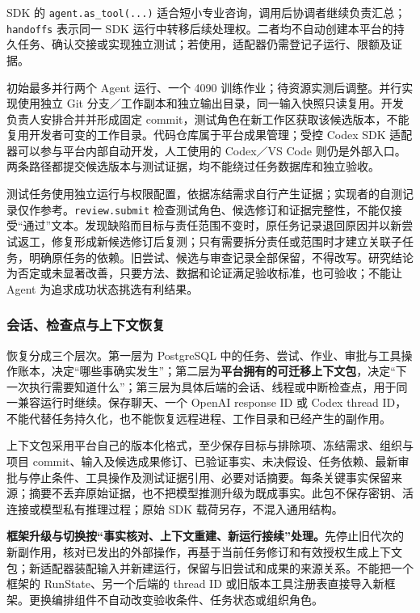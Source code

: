 \documentclass[11pt,a4paper]{article}
\begin{document}
SDK 的 \texttt{agent.as\_tool(...)} 适合短小专业咨询，调用后协调者继续负责汇总；\texttt{handoffs} 表示同一 SDK 运行中转移后续处理权。二者均不自动创建本平台的持久任务、确认交接或实现独立测试；若使用，适配器仍需登记子运行、限额及证据。\cite{rdRuntimeOrchestration}

初始最多并行两个 Agent 运行、一个 4090 训练作业；待资源实测后调整。并行实现使用独立 Git 分支／工作副本和独立输出目录，同一输入快照只读复用。开发负责人安排合并并形成固定 commit，测试角色在新工作区获取该候选版本，不能复用开发者可变的工作目录。代码仓库属于平台成果管理；受控 Codex SDK 适配器可以参与平台内部自动开发，人工使用的 Codex／VS Code 则仍是外部入口。两条路径都提交候选版本与测试证据，均不能绕过任务数据库和独立验收。

测试任务使用独立运行与权限配置，依据冻结需求自行产生证据；实现者的自测记录仅作参考。\texttt{review.submit} 检查测试角色、候选修订和证据完整性，不能仅接受“通过”文本。发现缺陷而目标与责任范围不变时，原任务记录退回原因并以新尝试返工，修复形成新候选修订后复测；只有需要拆分责任或范围时才建立关联子任务，明确原任务的依赖。旧尝试、候选与审查记录全部保留，不得改写。研究结论为否定或未显著改善，只要方法、数据和论证满足验收标准，也可验收；不能让 Agent 为追求成功状态挑选有利结果。

\subsubsection{会话、检查点与上下文恢复}

恢复分成三个层次。第一层为 PostgreSQL 中的任务、尝试、作业、审批与工具操作账本，决定“哪些事确实发生”；第二层为\textbf{平台拥有的可迁移上下文包}，决定“下一次执行需要知道什么”；第三层为具体后端的会话、线程或中断检查点，用于同一兼容运行时继续。保存聊天、一个 OpenAI response ID 或 Codex thread ID，不能代替任务持久化，也不能恢复远程进程、工作目录和已经产生的副作用。

上下文包采用平台自己的版本化格式，至少保存目标与排除项、冻结需求、组织与项目 commit、输入及候选成果修订、已验证事实、未决假设、任务依赖、最新审批与停止条件、工具操作及测试证据引用、必要对话摘要。每条关键事实保留来源；摘要不丢弃原始证据，也不把模型推测升级为既成事实。此包不保存密钥、活连接或模型私有推理过程；原始 SDK 载荷另存，不混入通用结构。

\textbf{框架升级与切换按“事实核对、上下文重建、新运行接续”处理。}先停止旧代次的新副作用，核对已发出的外部操作，再基于当前任务修订和有效授权生成上下文包；新适配器装配输入并新建运行，保留与旧尝试和成果的来源关系。不能把一个框架的 RunState、另一个后端的 thread ID 或旧版本工具注册表直接导入新框架。更换编排组件不自动改变验收条件、任务状态或组织角色。
\end{document}
